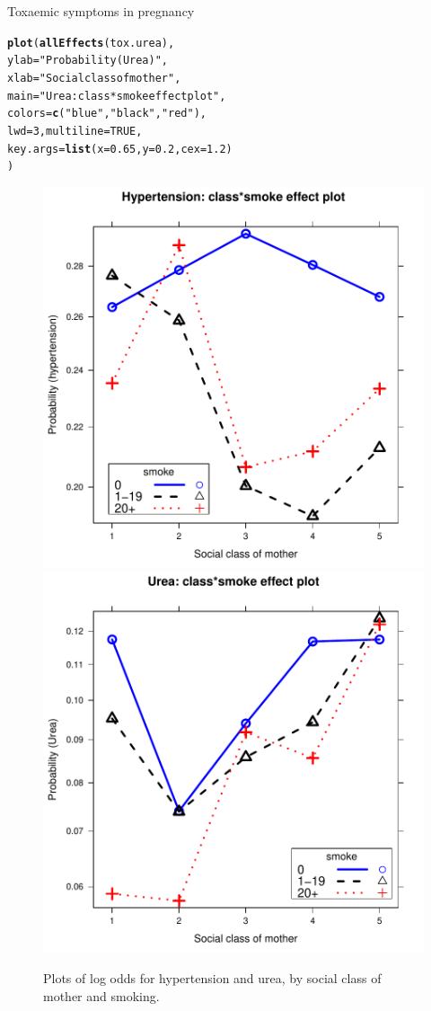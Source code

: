 \documentclass[11pt]{book}\usepackage[]{graphicx}\usepackage[]{color}
\makeatletter
\newcommand{\hlnum}[1]{\textcolor[rgb]{0.686,0.059,0.569}{#1}}%
\newcommand{\hlstr}[1]{\textcolor[rgb]{0.192,0.494,0.8}{#1}}%
\newcommand{\hlstd}[1]{\textcolor[rgb]{0.345,0.345,0.345}{#1}}%
\newcommand{\hlkwc}[1]{\textcolor[rgb]{0.333,0.667,0.333}{#1}}%
\newcommand{\hlkwd}[1]{\textcolor[rgb]{0.737,0.353,0.396}{\textbf{#1}}}%
\newenvironment{kframe}{%
 \def\at@end@of@kframe{}%
 \ifinner\ifhmode%
  \def\at@end@of@kframe{\end{minipage}}%
  \begin{minipage}{\columnwidth}%
 \fi\fi%
 \def\FrameCommand##1{\hskip\@totalleftmargin \hskip-\fboxsep
 \colorbox{shadecolor}{##1}\hskip-\fboxsep
     \hskip-\linewidth \hskip-\@totalleftmargin \hskip\columnwidth}%
 \MakeFramed {\advance\hsize-\width
   \@totalleftmargin\z@ \linewidth\hsize
   \@setminipage}}%
 {\par\unskip\endMakeFramed%
 \at@end@of@kframe}
\newenvironment{knitrout}{}{} %
\renewenvironment{knitrout}{\small\renewcommand{\baselinestretch}{.85}}{} %
\makeatother
\begin{document}
\begin{Example}[toxaemia]{Toxaemic symptoms in pregnancy}
\begin{knitrout}
\begin{kframe}
\begin{alltt}
\hlkwd{plot}\hlstd{(}\hlkwd{allEffects}\hlstd{(tox.urea),}
  \hlkwc{ylab} \hlstd{=} \hlstr{"Probability (Urea)"}\hlstd{,}
  \hlkwc{xlab} \hlstd{=} \hlstr{"Social class of mother"}\hlstd{,}
  \hlkwc{main} \hlstd{=} \hlstr{"Urea: class*smoke effect plot"}\hlstd{,}
  \hlkwc{colors} \hlstd{=} \hlkwd{c}\hlstd{(}\hlstr{"blue"}\hlstd{,} \hlstr{"black"}\hlstd{,} \hlstr{"red"}\hlstd{),}
  \hlkwc{lwd}\hlstd{=}\hlnum{3}\hlstd{,}  \hlkwc{multiline}\hlstd{=}\hlnum{TRUE}\hlstd{,}
  \hlkwc{key.args}\hlstd{=}\hlkwd{list}\hlstd{(}\hlkwc{x}\hlstd{=}\hlnum{0.65}\hlstd{,} \hlkwc{y}\hlstd{=}\hlnum{0.2}\hlstd{,} \hlkwc{cex}\hlstd{=}\hlnum{1.2}\hlstd{)}
  \hlstd{)}
\end{alltt}
\end{kframe}\begin{figure}[!htbp]


\centerline{\includegraphics[width=.5\textwidth]{ch08/fig/tox-effplots-1} 
\includegraphics[width=.5\textwidth]{ch08/fig/tox-effplots-2} }

\caption[Plots of log odds for hypertension and urea, by social class of mother and smoking]{Plots of log odds for hypertension and urea, by social class of mother and smoking.\label{fig:tox-effplots}}
\end{figure}



\end{knitrout}
\end{Example}
\end{document}
